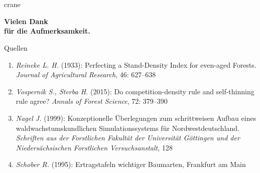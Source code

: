 \section*{}

\begin{frame}[plain]
  \begin{center}

    \begin{minipage}{0.75\textwidth}
      \begin{beamercolorbox}{crane}
        \begin{center}
          \vspace{1em}
          \textbf{\huge Vielen Dank}
          \\
          \textbf{\small für die Aufmerksamkeit.}
          \\
          \vspace{1em}
        \end{center}
      \end{beamercolorbox}
    \end{minipage}

    \hspace{0.017\textwidth}  %
    \begin{minipage}{0.725\textwidth}
      \begin{block}{Quellen}
        \begin{tiny}
          \begin{enumerate}
          \item \emph{Reineke L. H.} (1933): Perfecting a Stand-Density Index for even-aged Forests. \emph{Journal of Agricultural Research}, 46: 627--638
          \item \emph{Vospernik S., Sterba H.} (2015): Do competition-density rule and self-thinning rule agree? \emph{Annals of Forest Science}, 72: 379--390
          \item \emph{Nagel J.} (1999): Konzeptionelle Überlegungen zum schrittweisen Aufbau eines waldwachstumskundlichen Simulationssystems für Nordwestdeutschland. \emph{Schriften aus der Forstlichen Fakultät der Universität Göttingen und der Niedersächsischen Forstlichen Versuchsanstalt}, 128
          \item \emph{Schober R.} (1995): Ertragstafeln wichtiger Baumarten, Frankfurt am Main
          \end{enumerate}
        \end{tiny}
      \end{block}
    \end{minipage}
  \end{center}
\end{frame}

